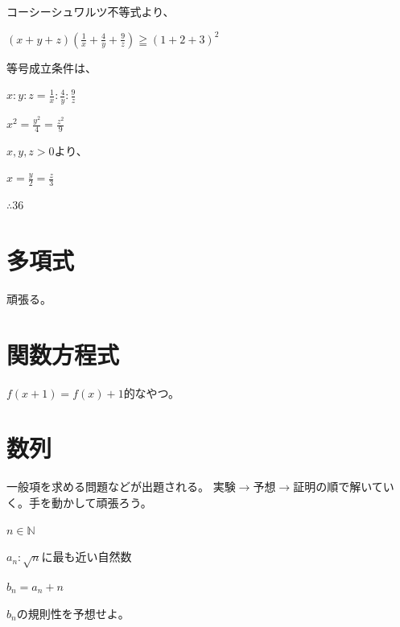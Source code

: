 \documentclass[uplatex,dvipdfmx]{jsbook}
\begin{document}
\begin{answer}
    コーシーシュワルツ不等式より、

    $\displaystyle \left(x+y+z\right)\left(\frac{1}{x}+\frac{4}{y}+\frac{9}{z}\right)\geqq \left(1+2+3\right)^2$

    等号成立条件は、

    $\displaystyle x:y:z=\frac{1}{x}:\frac{4}{y}:\frac{9}{z}$

    $x^2=\frac{y^2}{4}=\frac{z^2}{9}$

    $x,y,z>0$より、

    $x=\frac{y}{2}=\frac{z}{3}$

    $\therefore 36$
\end{answer}

\section{多項式}
頑張る。

\section{関数方程式}
$f\left(x+1\right)=f\left(x\right)+1$的なやつ。

\section{数列}
一般項を求める問題などが出題される。
実験$\rightarrow$予想$\rightarrow$証明の順で解いていく。手を動かして頑張ろう。

\begin{problem}[練習問題1]
    $n\in \mathbb{N}$

    $a_n:\sqrt{n}$に最も近い自然数

    $b_n=a_n+n$

    $b_n$の規則性を予想せよ。
\end{problem}
\end{document}
